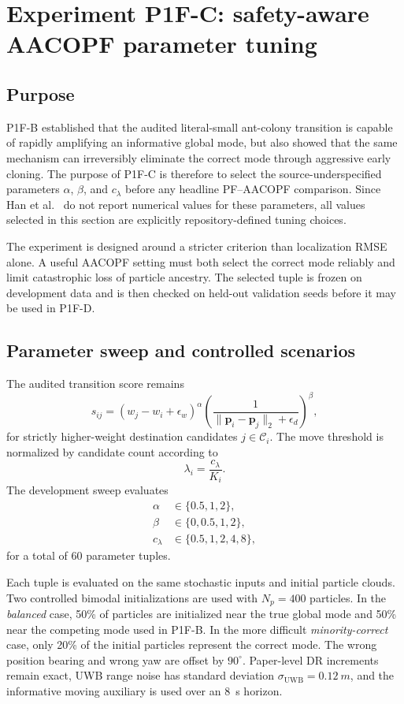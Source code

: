 \section{Experiment P1F-C: safety-aware AACOPF parameter tuning}
\subsection{Purpose}
P1F-B established that the audited literal-small ant-colony transition is capable of rapidly amplifying an informative global mode, but also showed that the same mechanism can irreversibly eliminate the correct mode through aggressive early cloning. The purpose of P1F-C is therefore to select the source-underspecified parameters $\alpha$, $\beta$, and $c_\lambda$ before any headline PF--AACOPF comparison. Since Han et al.~\cite{han2020cooperative} do not report numerical values for these parameters, all values selected in this section are explicitly repository-defined tuning choices.

The experiment is designed around a stricter criterion than localization RMSE alone. A useful AACOPF setting must both select the correct mode reliably and limit catastrophic loss of particle ancestry. The selected tuple is frozen on development data and is then checked on held-out validation seeds before it may be used in P1F-D.

\subsection{Parameter sweep and controlled scenarios}
The audited transition score remains
\begin{equation}
    s_{ij}=(w_j-w_i+\epsilon_w)^\alpha
    \left(\frac{1}{\lVert\bm p_i-\bm p_j\rVert_2+\epsilon_d}\right)^\beta,
\end{equation}
for strictly higher-weight destination candidates $j\in\mathcal C_i$. The move threshold is normalized by candidate count according to
\begin{equation}
    \lambda_i=\frac{c_\lambda}{K_i}.
\end{equation}
The development sweep evaluates
\begin{align}
    \alpha &\in \{0.5,1,2\},\\
    \beta &\in \{0,0.5,1,2\},\\
    c_\lambda &\in \{0.5,1,2,4,8\},
\end{align}
for a total of 60 parameter tuples.

Each tuple is evaluated on the same stochastic inputs and initial particle clouds. Two controlled bimodal initializations are used with $N_p=400$ particles. In the \emph{balanced} case, 50\% of particles are initialized near the true global mode and 50\% near the competing mode used in P1F-B. In the more difficult \emph{minority-correct} case, only 20\% of the initial particles represent the correct mode. The wrong position bearing and wrong yaw are offset by $90^\circ$. Paper-level DR increments remain exact, UWB range noise has standard deviation $\sigma_{\mathrm{UWB}}=\SI{0.12}{m}$, and the informative moving auxiliary is used over an \SI{8}{s} horizon.

